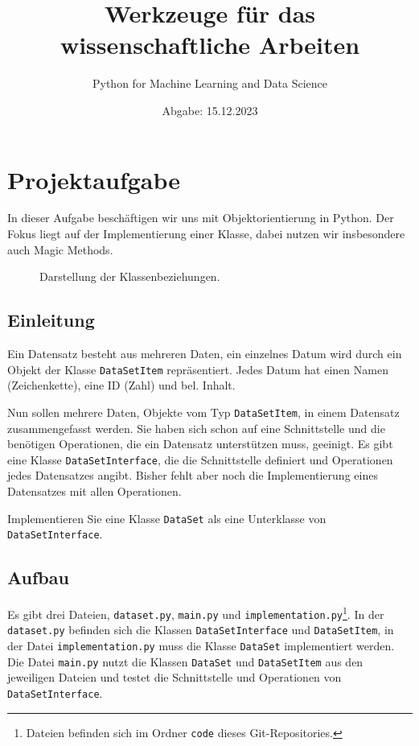 \documentclass[12pt, a4paper, parskip=full]{scrartcl}
\title{Werkzeuge für das wissenschaftliche Arbeiten}
\date{Abgabe: 15.12.2023}
\author{Python for Machine Learning and Data Science}
\begin{document}
\maketitle
\tableofcontents

\section{Projektaufgabe}
In dieser Aufgabe beschäftigen wir uns mit Objektorientierung in Python.
Der Fokus liegt auf der Implementierung einer Klasse, dabei nutzen wir insbesondere auch Magic Methods.

\begin{figure}[htbp]
    \centering
    
    \caption{Darstellung der Klassenbeziehungen.}
\end{figure}
\subsection{Einleitung}
Ein Datensatz besteht aus mehreren Daten, ein einzelnes Datum wird durch ein Objekt der Klasse \texttt{DataSetItem} repräsentiert.
Jedes Datum hat einen Namen (Zeichenkette), eine ID (Zahl) und bel. Inhalt.

Nun sollen mehrere Daten, Objekte vom Typ \texttt{DataSetItem}, in einem Datensatz zusammengefasst werden.
Sie haben sich schon auf eine Schnittstelle und die benötigen Operationen, die ein Datensatz unterstützen muss, geeinigt.
Es gibt eine Klasse \texttt{DataSetInterface}, die die Schnittstelle definiert und Operationen jedes Datensatzes angibt.
Bisher fehlt aber noch die Implementierung eines Datensatzes mit allen Operationen.

Implementieren Sie eine Klasse \texttt{DataSet} als eine Unterklasse von \texttt{DataSetInterface}.

\subsection{Aufbau}
Es gibt drei Dateien, \texttt{dataset.py}, \texttt{main.py} und \texttt{implementation.py}\footnote{Dateien befinden sich im Ordner \texttt{code} dieses Git-Repositories.}.
In der \texttt{data\-set.py} befinden sich die Klassen \texttt{DataSetInterface} und \texttt{DataSetItem},
in der Datei \texttt{implementation.py} muss die Klasse \texttt{DataSet} implementiert werden.
Die Datei \texttt{main.py} nutzt die Klassen \texttt{DataSet} und \texttt{DataSetItem} aus den jeweiligen Dateien und testet die Schnittstelle und Operationen von \texttt{DataSetInterface}.
\end{document}
